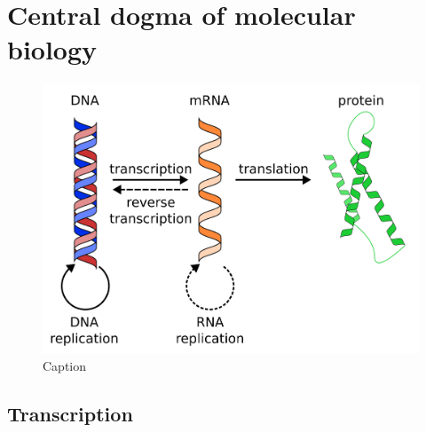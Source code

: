 \section{Central dogma of molecular biology}

\begin{figure}[H]
    \includegraphics[width=\linewidth]{ch1.Introduction/imgs/central_dogma.png}
    \caption{Caption}
    \label{fig:central_dogma}
\end{figure}

\subsection{Transcription}


